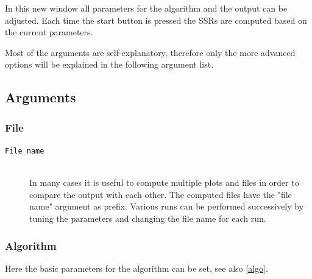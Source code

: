 \documentclass[a4paper,10pt]{article}
\begin{document}
In this new window all parameters for the algorithm and the output can be adjusted. Each time the start button is pressed
the SSRs are computed based on the current parameters.

Most of the arguments are self-explanatory, therefore only the more advanced options will be explained in the following
argument list.

\subsection{Arguments}

\subsubsection{File}

\begin{description}

\item[\texttt{File name}] \hfill \\

In many cases it is useful to compute multiple plots and files in order to compare the output with each other.
The computed files have the "file name" argument as prefix. Various runs can be performed
successively by tuning the parameters and changing the file name for each run.
 
\end{description}

\subsubsection{Algorithm}

Here the basic parameters for the algorithm can be set, see also \ref{algo}.
\end{document}
